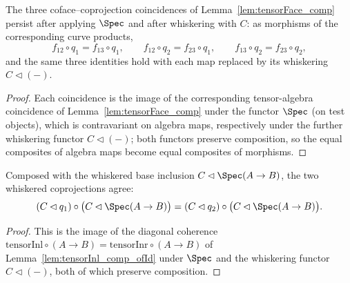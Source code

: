 \begin{lemma}
  \label{lem:overSpec_whisker_face}
  \leanok
  The three coface--coprojection coincidences of Lemma~\ref{lem:tensorFace_comp} persist after
  applying \(\Spec\) and after whiskering with \(C\): as morphisms of the corresponding
  curve products,
  \[
    f_{12} \circ q_1 = f_{13} \circ q_1, \qquad
    f_{12} \circ q_2 = f_{23} \circ q_1, \qquad
    f_{13} \circ q_2 = f_{23} \circ q_2,
  \]
  and the same three identities hold with each map replaced by its whiskering \(C \lhd (-)\).
\end{lemma}
\begin{proof}
  \leanok
  Each coincidence is the image of the corresponding tensor-algebra coincidence of
  Lemma~\ref{lem:tensorFace_comp} under the functor \(\Spec\) (on test objects), which is
  contravariant on algebra maps, respectively under the further whiskering functor
  \(C \lhd (-)\); both functors preserve composition, so the equal composites of algebra maps
  become equal composites of morphisms.
\end{proof}

\begin{lemma}
  \label{lem:whisker_inl_ofId}
  \leanok
  Composed with the whiskered base inclusion \(C \lhd \Spec(A \to B)\), the two whiskered
  coprojections agree:
  \[
    (C \lhd q_1) \circ \bigl(C \lhd \Spec(A \to B)\bigr)
      = (C \lhd q_2) \circ \bigl(C \lhd \Spec(A \to B)\bigr).
  \]
\end{lemma}
\begin{proof}
  \leanok
  This is the image of the diagonal coherence \(\mathrm{tensorInl} \circ (A \to B) =
  \mathrm{tensorInr} \circ (A \to B)\) of Lemma~\ref{lem:tensorInl_comp_ofId} under \(\Spec\)
  and the whiskering functor \(C \lhd (-)\), both of which preserve composition.
\end{proof}

